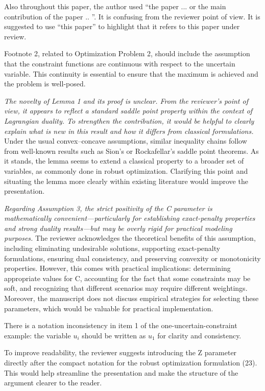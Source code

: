 \documentclass[journal,twoside,web]{ieeecolor}
\begin{document}
Also throughout this paper, the author used ``the paper ... or the main contribution of the paper .. ''. It is confusing from the reviewer point of view. It is suggested to use ``this paper'' to highlight that it refers to this paper under review.

Footnote 2, related to Optimization Problem 2, should include the assumption that the constraint functions are continuous with respect to the uncertain variable. This continuity is essential to ensure that the maximum is achieved and the problem is well-posed.

\textcolor{reviewerred}{\textit{The novelty of Lemma 1 and its proof is unclear. From the reviewer's point of view, it appears to reflect a standard saddle point property within the context of Lagrangian duality. To strengthen the contribution, it would be helpful to clearly explain what is new in this result and how it differs from classical formulations.}} Under the usual convex–concave assumptions, similar inequality chains follow from well-known results such as Sion's or Rockafellar's saddle point theorems. As it stands, the lemma seems to extend a classical property to a broader set of variables, as commonly done in robust optimization. Clarifying this point and situating the lemma more clearly within existing literature would improve the presentation.

\textcolor{reviewerred}{\textit{Regarding Assumption 3, the strict positivity of the C parameter is mathematically convenient—particularly for establishing exact-penalty properties and strong duality results—but may be overly rigid for practical modeling purposes.}} The reviewer acknowledges the theoretical benefits of this assumption, including eliminating undesirable solutions, supporting exact-penalty formulations, ensuring dual consistency, and preserving convexity or monotonicity properties. However, this comes with practical implications: determining appropriate values for C, accounting for the fact that some constraints may be soft, and recognizing that different scenarios may require different weightings. Moreover, the manuscript does not discuss empirical strategies for selecting these parameters, which would be valuable for practical implementation.

There is a notation inconsistency in item 1 of the one-uncertain-constraint example: the variable $u_i$ should be written as $u_1$ for clarity and consistency.

To improve readability, the reviewer suggests introducing the Z parameter directly after the compact notation for the robust optimization formulation (23). This would help streamline the presentation and make the structure of the argument clearer to the reader.
\end{document}
